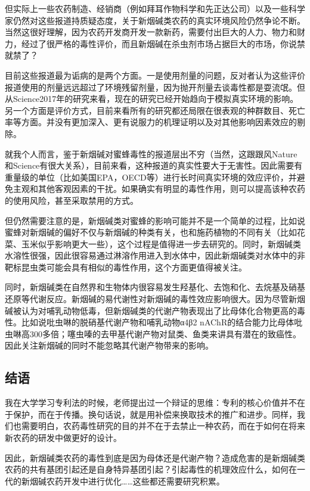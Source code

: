 \documentclass[]{book}
\begin{document}
但实际上一些农药制造、经销商（例如拜耳作物科学和先正达公司）以及一些科学家仍然对这些报道持质疑态度，关于新烟碱类农药的真实环境风险仍然争论不断。当然这很好理解，因为农药开发商开发一款新药，需要付出巨大的人力、物力和财力，经过了很严格的毒性评价，而且新烟碱在杀虫剂市场占据巨大的市场，你说禁就禁了？

目前这些报道最为诟病的是两个方面。一是使用剂量的问题，反对者认为这些评价报道使用的剂量远远超过了环境残留剂量，因为抛开剂量去谈毒性都是耍流氓。但从Science2017年的研究来看，现在的研究已经开始趋向于模拟真实环境的影响。另一个方面是评价方式，目前来看所有的研究都还局限在很表观的种群数目、死亡率等方面。并没有更加深入、更有说服力的机理证明以及对其他影响因素效应的剔除。

就我个人而言，鉴于新烟碱对蜜蜂毒性的报道层出不穷（当然，这跟跟风Nature和Science有很大关系），目前来看，这种报道的真实性要大于无害性。因此需要有重量级的单位（比如美国EPA，OECD等）进行长时间真实环境的效应评价，并避免主观和其他客观因素的干扰。如果确实有明显的毒性作用，则可以提高该种农药的使用风险，甚至采取禁用的方式。

但仍然需要注意的是，新烟碱类对蜜蜂的影响可能并不是一个简单的过程，比如说蜜蜂对新烟碱的偏好不仅与新烟碱的种类有关，也和施药植物的不同有关（比如花菜、玉米似乎影响更大一些），这个过程是值得进一步去研究的。同时，新烟碱类水溶性很强，因此很容易通过淋溶作用进入到水体中，因此新烟碱类对水体中的非靶标昆虫类可能会具有相似的毒性作用，这个方面更值得被关注。

同时，新烟碱类在自然界和生物体内很容易发生羟基化、去饱和化、去烷基及硝基还原等代谢反应。新烟碱的易代谢性对新烟碱的毒性效应影响很大。因为尽管新烟碱被认为对哺乳动物低毒，但新烟碱类的代谢产物表现出了比母体化合物更高的毒性。比如说吡虫啉的脱硝基代谢产物和哺乳动物α4β2 nAChR的结合能力比母体吡虫啉高300多倍；噻虫嗪的去甲基代谢产物对鼠类、鱼类来讲具有潜在的致癌性。因此关注新烟碱的同时不能忽略其代谢产物带来的影响。

\hypertarget{ux7ed3ux8bed-5}{%
\subsection{结语}\label{ux7ed3ux8bed-5}}

我在大学学习专利法的时候，老师提出过一个辩证的思维：专利的核心价值并不在于保护，而在于传播。换句话说，就是用补偿来换取技术的推广和进步。同样，我们也需要明白，农药毒性研究的目的并不在于去禁止一种农药，而在于如何在将来新农药的研发中做更好的设计。

因此，新烟碱类农药的毒性到底是因为母体还是代谢产物？造成危害的是新烟碱类农药的共有基团引起还是自身特异基团引起？引起毒性的机理效应什么，如何在一代的新烟碱农药开发中进行优化\ldots{}\ldots{}这些都还需要研究积累。
\end{document}
